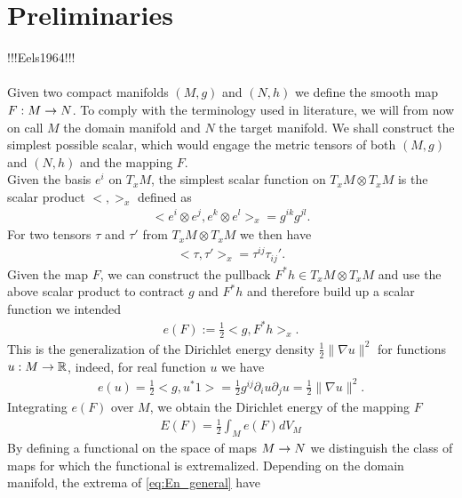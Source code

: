 \section{Preliminaries}
\label{sec:preliminaries}

!!!Eels1964!!!\\\\

Given two compact manifolds $(M,g)$ and $(N,h)$ we define the smooth
map $F:M\rightarrow N$. To comply with the terminology used in literature, we
will from now on call $M$ the domain manifold and $N$ the target
manifold. We shall construct the simplest possible scalar,
which would engage the metric tensors of both $(M,g)$ and $(N,h)$ and the mapping $F$.\\
Given the basis $e^i$ on $T_x M$, the simplest scalar function on $T_x
M\otimes T_x M$ is the scalar product $<,>_x$ defined as
\begin{align}
  \label{eq:25}
  <e^i\otimes e^j,e^k\otimes e^l>_x=g^{ik}g^{jl}.
\end{align}
For two tensors $\tau$ and $\tau'$ from $T_x M\otimes T_x M$ we then
have
\begin{align}
  \label{eq:26}
  <\tau,\tau'>_x=\tau^{ij}\tau_{ij}'.
\end{align}
Given the map $F$, we can construct the pullback $F^*h\in T_x M\otimes
T_x M$ and use the above scalar product to contract $g$ and $F^* h$
and therefore build up a scalar function we intended
\begin{align}
  \label{eq:28}
  e(F):=\frac{1}{2}<g,F^*h>_x.
\end{align}
This is the generalization of the Dirichlet energy density
$\frac{1}{2}\lVert\nabla u\rVert^2$ for functions $u:M\rightarrow\mathbb{R}$,
indeed, for real function $u$ we have
\begin{align}
  \label{eq:29}
  e(u)=\frac{1}{2}<g,u^*1>=\frac{1}{2}g^{ij}\partial_i u\partial_j u
  =\frac{1}{2}\lVert\nabla u\rVert^2.
\end{align}
Integrating $e(F)$ over $M$, we obtain the Dirichlet energy of the
mapping $F$
\begin{align}\label{eq:En_general}
  E(F)=\frac{1}{2}\int_M e(F)dV_M
\end{align}
By defining a functional on the space of maps $M\rightarrow N$ we distinguish
the class of maps for which the functional is extremalized. Depending
on the domain manifold, the extrema of \eqref{eq:En_general} have
